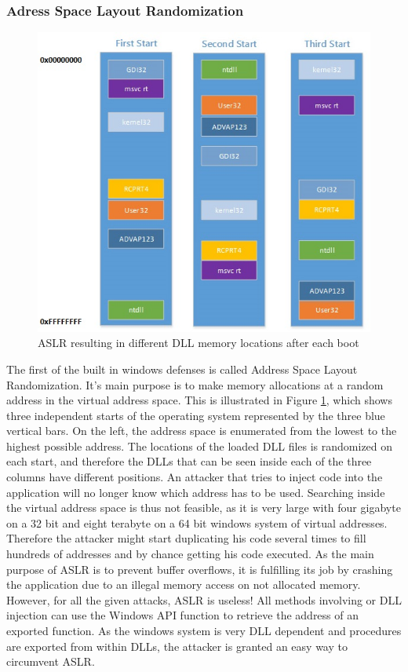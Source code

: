 \subsubsection{Adress Space Layout Randomization}
\begin{figure}[h]
\centering
\includegraphics[width=\textwidth,height=\textheight,keepaspectratio]{sections/background/defenses/aslr.jpg}
\caption{ASLR resulting in different DLL memory locations after each boot}
\label{fig:aslr}
\end{figure}
The first of the built in windows defenses is called Address Space Layout Randomization. It's main purpose is to make memory allocations at a random address in the virtual address space. This is illustrated in Figure \ref{fig:aslr}, which shows three independent starts of the operating system represented by the three blue vertical bars. On the left, the address space is enumerated from the lowest to the highest possible address. The locations of the loaded DLL files is randomized on each start, and therefore the DLLs that can be seen inside each of the three columns have different positions. An attacker that tries to inject code into the application will no longer know which address has to be used. Searching inside the virtual address space is thus not feasible, as it is very large with four gigabyte on a 32 bit and eight terabyte on a 64 bit windows system of virtual addresses. Therefore the attacker might start duplicating his code several times to fill hundreds of addresses and by chance getting his code executed. As the main purpose of ASLR is to prevent buffer overflows, it is fulfilling its job by crashing the application due to an illegal memory access on not allocated memory. However, for all the given attacks, ASLR is useless! All methods involving  or DLL injection can use the Windows API function  to retrieve the address of an exported function. As the windows system is very DLL dependent and procedures are exported from within DLLs, the attacker is granted an easy way to circumvent ASLR.